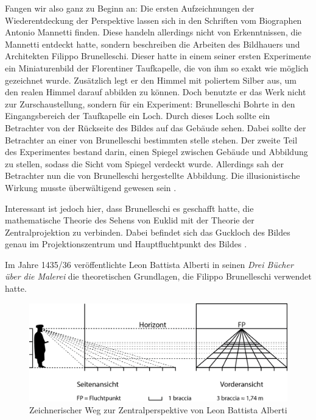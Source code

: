 \documentclass[12pt,a4paper]{article}
\begin{document}
Fangen wir also ganz zu Beginn an: Die ersten Aufzeichnungen der Wiederentdeckung der Perspektive lassen sich in den Schriften vom Biographen Antonio Mannetti finden. Diese handeln allerdings nicht von Erkenntnissen, die Mannetti entdeckt hatte, sondern beschreiben die Arbeiten des Bildhauers und Architekten Filippo Brunelleschi. Dieser hatte in einem seiner ersten Experimente ein Miniaturenbild der Florentiner Taufkapelle, die von ihm so exakt wie möglich gezeichnet wurde. Zusätzlich legt er den Himmel mit poliertem Silber aus, um den realen Himmel darauf abbilden zu können. Doch benutzte er das Werk nicht zur Zurschaustellung, sondern für ein Experiment: Brunelleschi Bohrte in den Eingangsbereich der Taufkapelle ein Loch. Durch dieses Loch sollte ein Betrachter von der Rückseite des Bildes auf das Gebäude sehen. Dabei sollte der Betrachter an einer von Brunelleschi bestimmten stelle stehen. Der zweite Teil des Experimentes bestand darin, einen Spiegel zwischen Gebäude und Abbildung zu stellen, sodass die Sicht vom Spiegel verdeckt wurde. Allerdings sah der Betrachter nun die von Brunelleschi hergestellte Abbildung. Die illusionistische Wirkung musste überwältigend gewesen sein \citep[S.~28f]{perspektive}.

Interessant ist jedoch hier, dass Brunelleschi es geschafft hatte, die mathematische Theorie des Sehens von Euklid mit der Theorie der Zentralprojektion zu verbinden. Dabei befindet sich das Guckloch des Bildes genau im Projektionszentrum und Hauptfluchtpunkt des Bildes \citep[S.~30]{perspektive}.

Im Jahre 1435/36 veröffentlichte Leon Battista Alberti in seinen \textit{Drei Bücher über die Malerei} die theoretischen Grundlagen, die Filippo Brunelleschi verwendet hatte. 

\begin{figure}[htbp] 
\centering
\includegraphics[width=\textwidth]{Bilder/braccia.png}
\caption{Zeichnerischer Weg zur Zentralperspektive von Leon Battista Alberti}
\label{fig:braccia}
\end{figure}
\end{document}
